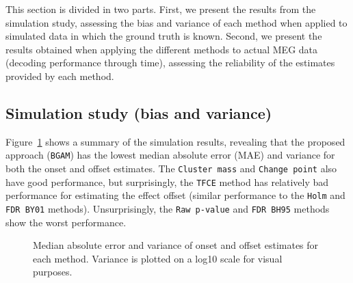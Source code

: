 \documentclass[
  man,
  floatsintext,
  longtable,
  a4paper,
  nolmodern,
  notxfonts,
  notimes,
  colorlinks=true,linkcolor=blue,citecolor=blue,urlcolor=blue]{apa7}
\begin{document}
This section is divided in two parts. First, we present the results from
the simulation study, assessing the bias and variance of each method
when applied to simulated data in which the ground truth is known.
Second, we present the results obtained when applying the different
methods to actual MEG data (decoding performance through time),
assessing the reliability of the estimates provided by each method.

\subsection{Simulation study (bias and
variance)}\label{simulation-study-bias-and-variance}

Figure~\ref{fig-simulation-results} shows a summary of the simulation
results, revealing that the proposed approach (\texttt{BGAM}) has the
lowest median absolute error (MAE) and variance for both the onset and
offset estimates. The \texttt{Cluster\ mass} and \texttt{Change\ point}
also have good performance, but surprisingly, the \texttt{TFCE} method
has relatively bad performance for estimating the effect offset (similar
performance to the \texttt{Holm} and \texttt{FDR\ BY01} methods).
Unsurprisingly, the \texttt{Raw\ p-value} and \texttt{FDR\ BH95} methods
show the worst performance.

\begin{figure}[!htb]

\caption{\label{fig-simulation-results}Median absolute error and
variance of onset and offset estimates for each method. Variance is
plotted on a log10 scale for visual purposes.}


\end{figure}%
\end{document}
